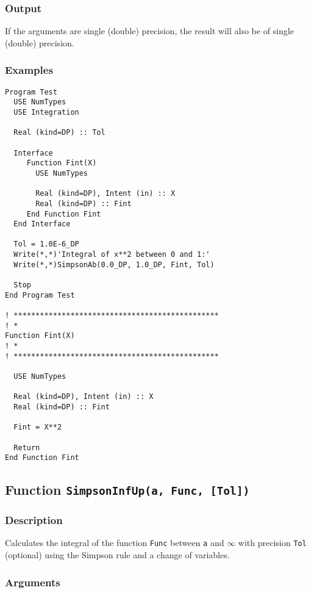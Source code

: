 \subsubsection{Output}

If the arguments are single (double) precision, the result will also be of
single (double) precision. 



\subsubsection{Examples}

\begin{verbatim}
Program Test
  USE NumTypes
  USE Integration

  Real (kind=DP) :: Tol

  Interface 
     Function Fint(X)
       USE NumTypes

       Real (kind=DP), Intent (in) :: X
       Real (kind=DP) :: Fint
     End Function Fint
  End Interface

  Tol = 1.0E-6_DP
  Write(*,*)'Integral of x**2 between 0 and 1:'
  Write(*,*)SimpsonAb(0.0_DP, 1.0_DP, Fint, Tol)

  Stop
End Program Test

! ***********************************************
! *
Function Fint(X)
! *  
! ***********************************************

  USE NumTypes

  Real (kind=DP), Intent (in) :: X
  Real (kind=DP) :: Fint

  Fint = X**2

  Return
End Function Fint
\end{verbatim}

\subsection{Function \texttt{SimpsonInfUp(a, Func, [Tol])}}

\subsubsection{Description}

Calculates the integral of the function \texttt{Func} between
\texttt{a} and $\infty$ with precision \texttt{Tol} (optional) using
the Simpson rule and a change of variables.


\subsubsection{Arguments}

